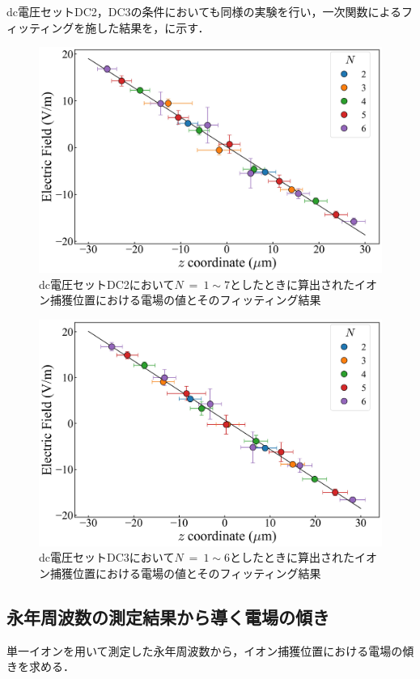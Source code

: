 dc電圧セットDC2，DC3の条件においても同様の実験を行い，一次関数によるフィッティングを施した結果を，に示す．

\begin{figure}[h]
	\begin{center}
		\includegraphics[width = 0.6\linewidth]{./results/figure/DC2_E.jpg}
		\caption{dc電圧セットDC2において$N \ = \ 1 \sim 7$としたときに算出されたイオン捕獲位置における電場の値とそのフィッティング結果}
		\label{fig:DC2_E}
	\end{center}
\end{figure}

\begin{figure}[h]
	\begin{center}
		\includegraphics[width = 0.6\linewidth]{./results/figure/DC3_E.jpg}
		\caption{dc電圧セットDC3において$N \ = \ 1 \sim 6$としたときに算出されたイオン捕獲位置における電場の値とそのフィッティング結果}
		\label{fig:DC3_E}
	\end{center}
\end{figure}
%
\clearpage
%

\subsection{永年周波数の測定結果から導く電場の傾き}\label{alpha_SecFreq}
単一イオンを用いて測定した永年周波数から，イオン捕獲位置における電場の傾きを求める．

